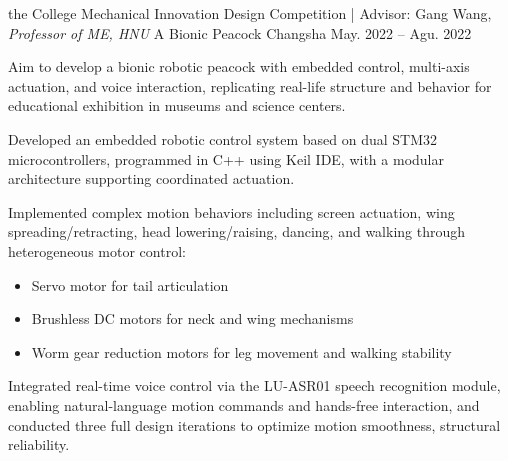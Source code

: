 \begin{cventries}
    \cventry
      {the College Mechanical Innovation Design Competition | Advisor: Gang Wang, \textit{Professor of ME, HNU}} %
      {A Bionic Peacock} %
      {Changsha} %
      {May. 2022 -- Agu. 2022} %
      {
        Aim to develop a bionic robotic peacock with embedded control, multi-axis actuation, and voice interaction, replicating real-life structure and behavior for educational exhibition in museums and science centers.
        \vspace{4.5mm}
        \begin{cvitems} %
          \item{Developed an embedded robotic control system based on dual STM32 microcontrollers, programmed in C++ using Keil IDE, with a modular architecture supporting coordinated actuation.}
          \item{Implemented complex motion behaviors including screen actuation, wing spreading/retracting, head lowering/raising, dancing, and walking through heterogeneous motor control:
          \begin{itemize}
            \item Servo motor for tail articulation
            \item Brushless DC motors for neck and wing mechanisms
            \item Worm gear reduction motors for leg movement and walking stability
          \end{itemize}}
          \item{Integrated real-time voice control via the LU-ASR01 speech recognition module, enabling natural-language motion commands and hands-free interaction, and conducted three full design iterations to optimize motion smoothness, structural reliability.}
		      \end{cvitems}
      }    

  
    
\end{cventries}
